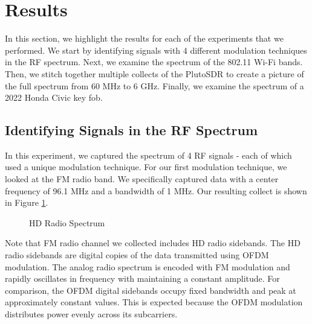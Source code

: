 \documentclass{article}
\begin{document}
\section{Results}

In this section, we highlight the results for each of the experiments that we performed. We start by identifying signals with 4 different modulation techniques in the RF spectrum. Next, we examine the spectrum of the 802.11 Wi-Fi bands. Then, we stitch together multiple collects of the PlutoSDR to create a picture of the full spectrum from 60 MHz to 6 GHz. Finally, we examine the spectrum of a 2022 Honda Civic key fob. 


\subsection{Identifying Signals in the RF Spectrum}

In this experiment, we captured the spectrum of 4 RF signals - each of which used a unique modulation technique. For our first modulation technique, we looked at the FM radio band. We specifically captured data with a center frequency of 96.1 MHz and a bandwidth of 1 MHz. Our resulting collect is shown in Figure \ref{fig::hd_radio_spectrum}.

\begin{figure}[H]
	\centerline{}
	\caption{HD Radio Spectrum}
	\label{fig::hd_radio_spectrum}
\end{figure}


Note that FM radio channel we collected includes HD radio sidebands. The HD radio sidebands are digital copies of the data transmitted using OFDM modulation. The analog radio spectrum is encoded with FM modulation and rapidly oscillates in frequency with maintaining a constant amplitude. For comparison, the OFDM digital sidebands occupy fixed bandwidth and peak at approximately constant values. This is expected because the OFDM modulation distributes power evenly across its subcarriers.
\end{document}
